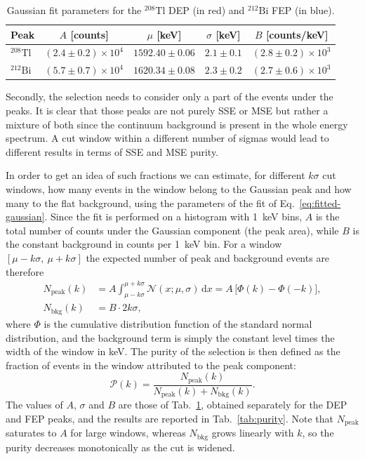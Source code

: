 \begin{table}[H]
    \centering
    \begin{tabular}{lcccc}
        \toprule
        Peak & $A$ [counts] & $\mu$ [keV] & $\sigma$ [keV] & $B$ [counts/keV] \\
        \midrule
        ${}^{208}\text{Tl}$ & $(2.4 \pm 0.2) \times 10^{4}$ & $1592.40 \pm 0.06$ & $2.1 \pm 0.1$ & $(2.8 \pm 0.2) \times 10^{3}$ \\
        ${}^{212}\text{Bi}$ & $(5.7 \pm 0.7) \times 10^{4}$ & $1620.34 \pm 0.08$ & $2.3 \pm 0.2$ & $(2.7 \pm 0.6) \times 10^{3}$ \\
        \bottomrule
    \end{tabular}
    \caption{Gaussian fit parameters for the ${}^{208}\text{Tl}$ \ac{DEP} (in red) and ${}^{212}\text{Bi}$ \ac{FEP} (in blue).}
    \label{tab:gaussianfit_parameters}
\end{table}

Secondly, the selection needs to consider only a part of the events under the peaks. It is clear that those peaks are not purely \ac{SSE} or \ac{MSE} but rather a mixture of both since the continuum background is present in the whole energy spectrum. A cut window within a different number of sigmas would lead to different results in terms of \ac{SSE} and \ac{MSE} purity. 

In order to get an idea of such fractions we can estimate, for different $k\sigma$ cut windows, how many events in the window belong to the Gaussian peak and how many to the flat background, using the parameters of the fit of Eq.~\ref{eq:fitted-gaussian}. Since the fit is performed on a histogram with 1~keV bins, $A$ is the total number of counts under the Gaussian component (the peak area), while $B$ is the constant background in counts per 1~keV bin. For a window $[\mu-k\sigma,\ \mu+k\sigma]$ the expected number of peak and background events are therefore
\begin{align}
N_{\mathrm{peak}}(k) &= A \int_{\mu-k\sigma}^{\mu+k\sigma} \mathcal{N}(x;\mu,\sigma)\,\mathrm{d}x = A\,\big[\Phi(k)-\Phi(-k)\big], \label{eq:npeak}\\
N_{\mathrm{bkg}}(k) &= B\cdot 2k\sigma, \label{eq:nbkg}
\end{align}
where $\Phi$ is the cumulative distribution function of the standard normal distribution, and the background term is simply the constant level times the width of the window in keV. The purity of the selection is then defined as the fraction of events in the window attributed to the peak component:
\begin{equation}
\mathcal{P}(k) = \frac{N_{\mathrm{peak}}(k)}{N_{\mathrm{peak}}(k)+N_{\mathrm{bkg}}(k)}.
\label{eq:purity}
\end{equation}
The values of $A$, $\sigma$ and $B$ are those of Tab.~\ref{tab:gaussianfit_parameters}, obtained separately for the \ac{DEP} and \ac{FEP} peaks, and the results are reported in Tab.~\ref{tab:purity}. Note that $N_{\mathrm{peak}}$ saturates to $A$ for large windows, whereas $N_{\mathrm{bkg}}$ grows linearly with $k$, so the purity decreases monotonically as the cut is widened.

